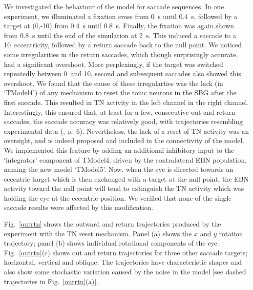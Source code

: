 \documentclass{frontiersSCNS}
\begin{document}
We investigated the behaviour of the model for saccade sequences.
In one experiment, we illuminated a fixation
cross from 0~s until 0.4~s, followed by a target at (0,-10\dg)
from 0.4~s until 0.8~s. Finally, the fixation was again shown from 0.8~s
until the end of the simulation at 2~s. This induced a saccade to a
10\dg~eccentricity, followed by a return saccade back to the
null point. We noticed some irregularities in the return saccades, which
though surprisingly accurate, had a significant overshoot.
More perplexingly, if the target was switched repeatedly between 0\dg~and
10\dg, second and subsequent  saccades also showed this
overshoot. We found that the cause of these irregularties was the
lack (in `TModel4') of any mechanism to reset the tonic neurons in the
SBG after the first saccade. This resulted in TN activity in the left
channel  in the right channel. Interestingly, this ensured
that, at  least for a few, consecutive out-and-return saccades, the saccade accuracy was
relatively good, with trajectories resembling experimental data
(\cite{bahill_trajectories_1979}, p.~6). %
Nevertheless, the lack of a reset of TN activity was an oversight, and
is indeed proposed and included in the connectivity of the
\cite{gancarz_neural_1998} model. We implemented this feature by adding an
additional inhibitory input to the `integrator' component of TModel4,
driven by the contralateral EBN population, naming the new model `TModel5'.
Now, when the eye is directed towards an eccentric target which is then
exchanged with a target at the null point, the EBN activity toward the
null point will tend to extinguish the TN activity which was holding
the eye at the eccentric position.
We verified that none of the single saccade results were affected
by this modification.
%

Fig.~\ref{outrtn} shows the
outward and return trajectories produced by the experiment
with the TN reset mechanism. Panel (a)
shows the $x$ and $y$ rotation trajectory; panel (b) shows individual
rotational components of the eye. Fig.~\ref{outrtn}(c) shows
out and return trajectories for three other saccade targets; horizontal,
vertical and oblique. The trajectories have characteristic shapes and
also show some stochastic variation caused by the noise in the model [see
dashed trajectories in Fig.~\ref{outrtn}(a)].
\end{document}
